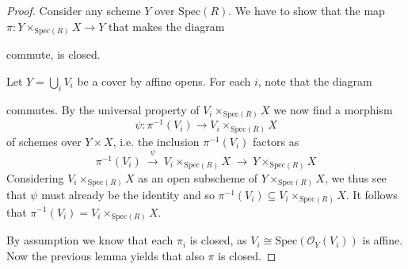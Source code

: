 \documentclass{scrartcl}
\newcommand{\Spec}{\mathrm{Spec}}
\renewcommand{\O}{\mathcal{O}}
\newcommand\restr[2]{{
    \left.\kern-\nulldelimiterspace
    #1
    \vphantom{\big|}
    \right|_{#2}
}}
\theoremstyle{definition}
\begin{document}
\begin{proof}
    Consider any scheme $Y$ over $\Spec(R)$.
    We have to show that the map $\pi: Y \times_{\Spec(R)} X \to Y$ that makes the diagram
    \begin{center}
    \end{center}
    commute, is closed.

    Let $Y = \bigcup_i V_i$ be a cover by affine opens.
    For each $i$, note that the diagram
    \begin{center}
    \end{center}
    commutes.
    By the universal property of $V_i \times_{\Spec(R)} X$ we now find a morphism
    \begin{equation*}
        \psi: \pi^{-1}(V_i) \to V_i \times_{\Spec(R)} X
    \end{equation*}
    of schemes over $Y \times X$, i.e. the inclusion $\pi^{-1}(V_i)$ factors as
    \begin{equation*}
        \pi^{-1}(V_i) \ \overset{\psi}{\to} \ V_i \times_{\Spec(R)} X \ \to \ Y \times_{\Spec(R)} X
    \end{equation*}
    Considering $V_i \times_{\Spec(R)} X$ as an open subscheme of $Y \times_{\Spec(R)} X$, we thus see that $\psi$ must already be the identity and so $\pi^{-1}(V_i) \subseteq V_i \times_{\Spec(R)} X$.
    It follows that $\pi^{-1}(V_i) = V_i \times_{\Spec(R)} X$.

    By assumption we know that each $\pi_i$ is closed, as $V_i \cong \Spec(\O_Y(V_i))$ is affine.
    Now the previous lemma yields that also $\pi$ is closed.
\end{proof}
\end{document}
